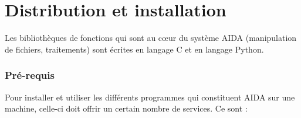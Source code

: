 \part{Distribution et installation}
\label{part:install}

\newcommand{\pathfmt}[1]{\path{#1}}
\newcommand{\clavier}[1]{\texttt{#1}}

  Les bibliothèques de fonctions qui sont au c\oe{}ur du système AIDA
(manipulation de fichiers, traitements) sont écrites en langage C et en
langage Python.

\section{Pré-requis}
  Pour installer et utiliser les différents programmes qui constituent
AIDA sur une machine, celle-ci doit offrir un certain nombre de
services. Ce sont :

